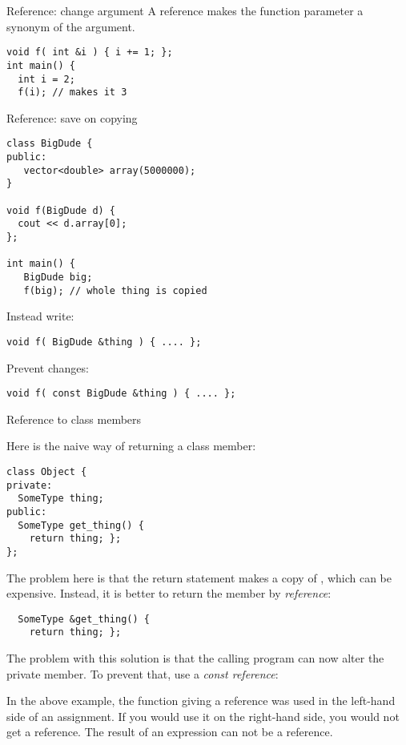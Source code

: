 \begin{block}{Reference: change argument}
\label{sl:refarg-change}
A reference makes the function parameter a synonym of the argument.
\begin{verbatim}
void f( int &i ) { i += 1; };
int main() {
  int i = 2;
  f(i); // makes it 3
\end{verbatim}
\end{block}

\begin{block}{Reference: save on copying}
\label{sl:refarg-nocopy}
\begin{multicols}{2}
\begin{verbatim}
class BigDude {
public:
   vector<double> array(5000000);
}

void f(BigDude d) {
  cout << d.array[0];
};

int main() {
   BigDude big;
   f(big); // whole thing is copied
\end{verbatim}
\columnbreak
Instead write:
\begin{verbatim}
void f( BigDude &thing ) { .... };
\end{verbatim}
Prevent changes:
\begin{verbatim}
void f( const BigDude &thing ) { .... };
\end{verbatim}
\hbox{}\vfill\hbox{}
\end{multicols}
\end{block}

 {Reference to class members}
\label{sec:class-ref}

Here is the naive way of returning a class member:
\begin{verbatim}
class Object {
private:
  SomeType thing;
public:
  SomeType get_thing() {
    return thing; };
};
\end{verbatim}
The problem here is that the return statement makes a copy of
, which can be expensive. Instead, it is better to return the
member by \emph{reference}:
\begin{verbatim}
  SomeType &get_thing() { 
    return thing; };
\end{verbatim}
The problem with this solution is that the calling program can now
alter the private member. To prevent that, use a
\emph{const reference}:
%

In the above example, the function giving a reference was used in the left-hand side of
an assignment. If you would use it on the right-hand side, you would
not get a reference. The result of an expression can not be a
reference.

